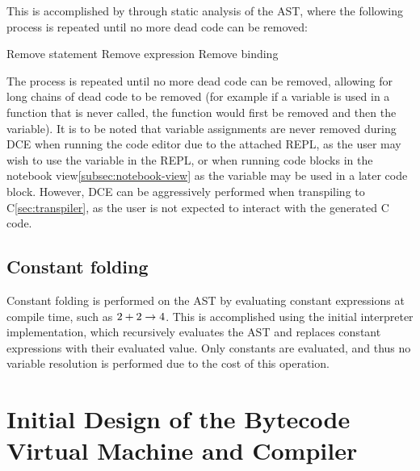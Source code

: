 This is accomplished by through static analysis of the AST, where the following process is repeated until no more dead
code can be removed:

\begin{algorithmic}
                    \State Remove statement
                \EndIf
                    \State Remove expression
                \EndIf
                    \State Remove binding
                \EndIf
            \EndIf
        \EndFor
    \EndWhile
\end{algorithmic}

The process is repeated until no more dead code can be removed, allowing for long chains of dead code to be 
removed (for example if a variable is used in a function that is never called, the function would first be removed
and then the variable).
It is to be noted that variable assignments are never removed during DCE when running the code editor due to the 
attached REPL, as the user may wish to use the variable in the REPL\@, or when running code blocks in the notebook 
view\ref{subsec:notebook-view} as the variable may be used in a later code block.
However, DCE can be aggressively performed when transpiling to C\ref{sec:transpiler}, as the user is not expected to 
interact with the generated C code.

\subsection{Constant folding}\label{subsec:constant-folding}

Constant folding is performed on the AST by evaluating constant expressions at compile time, such as $2 + 2 \rightarrow 4$.
This is accomplished using the initial interpreter implementation, which recursively evaluates the AST and replaces
constant expressions with their evaluated value.
Only constants are evaluated, and thus no variable resolution is performed due to the cost of this operation.

\section{Initial Design of the Bytecode Virtual Machine and Compiler}\label{sec:initial-design-of-the-bytecode-virtual-machine-and-compiler}

